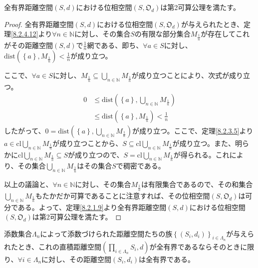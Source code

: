 \documentclass[dvipdfmx]{jsarticle}
\begin{document}
\begin{thm}\label{8.2.4.16}
全有界距離空間$(S,d)$における位相空間$\left( S,\mathfrak{O}_{d} \right)$は第2可算公理を満たす。
\end{thm}
\begin{proof}
全有界距離空間$(S,d)$における位相空間$\left( S,\mathfrak{O}_{d} \right)$が与えられたとき、定理\ref{8.2.4.12}より$\forall n \in \mathbb{N}$に対し、その集合$S$の有限な部分集合$M_{\frac{1}{n}}$が存在してこれがその距離空間$(S,d)$で$\frac{1}{n}$網である、即ち、$\forall a \in S$に対し、$\mathrm{dist}\left( \left\{ a \right\},M_{\frac{1}{n}} \right) < \frac{1}{n}$が成り立つ。\par
ここで、$\forall a \in S$に対し、$M_{\frac{1}{n}} \subseteq \bigcup_{n \in \mathbb{N}} M_{\frac{1}{n}}$が成り立つことにより、次式が成り立つ。
\begin{align*}
0 &\leq \mathrm{dist}\left( \left\{ a \right\},\bigcup_{n \in \mathbb{N}} M_{\frac{1}{n}} \right)\\
&\leq \mathrm{dist}\left( \left\{ a \right\},M_{\frac{1}{n}} \right) < \frac{1}{n}
\end{align*}
したがって、$0 = \mathrm{dist}\left( \left\{ a \right\},\bigcup_{n \in \mathbb{N}} M_{\frac{1}{n}} \right)$が成り立つ。ここで、定理\ref{8.2.3.5}より$a \in {\mathrm{cl}}{\bigcup_{n \in \mathbb{N}} M_{\frac{1}{n}}}$が成り立つことから、$S \subseteq {\mathrm{cl}}{\bigcup_{n \in \mathbb{N}} M_{\frac{1}{n}}}$が成り立つ。また、明らかに${\mathrm{cl}}{\bigcup_{n \in \mathbb{N}} M_{\frac{1}{n}}} \subseteq S$が成り立つので、$S = {\mathrm{cl}}{\bigcup_{n \in \mathbb{N}} M_{\frac{1}{n}}}$が得られる。これにより、その集合$\bigcup_{n \in \mathbb{N}} M_{\frac{1}{n}}$はその集合$S$で稠密である。\par
以上の議論と、$\forall n \in \mathbb{N}$に対し、その集合$M_{\frac{1}{n}}$は有限集合であるので、その和集合$\bigcup_{n \in \mathbb{N}} M_{\frac{1}{n}}$もたかだか可算であることに注意すれば、その位相空間$\left( S,\mathfrak{O}_{d} \right)$は可分である。よって、定理\ref{8.2.1.9}より全有界距離空間$(S,d)$における位相空間$\left( S,\mathfrak{O}_{d} \right)$は第2可算公理を満たす。
\end{proof}
\begin{thm}\label{8.2.4.17}
添数集合$\varLambda_{n}$によって添数づけられた距離空間たちの族$\left\{ \left( S_{i},d_{i} \right) \right\}_{i \in \varLambda_{n}}$が与えられたとき、これの直積距離空間$\left( \prod_{i \in \varLambda_{n}} S_{i},d \right)$が全有界であるならそのときに限り、$\forall i \in \varLambda_{n}$に対し、その距離空間$\left( S_{i},d_{i} \right)$は全有界である。
\end{thm}
\end{document}
